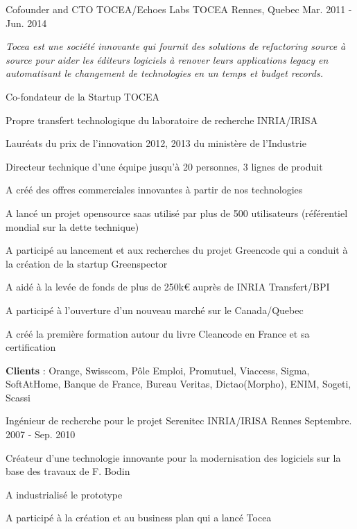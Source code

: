 \begin{cventries}
  \cventry
    {Cofounder and CTO TOCEA/Echoes Labs} %
    {TOCEA} %
    {Rennes, Quebec} %
    {Mar. 2011 - Jun. 2014} %
    {
      \begin{cvitems} %
      	 \item {\textit{Tocea est une société innovante qui fournit des solutions de refactoring source à source pour aider les éditeurs logiciels à renover leurs applications legacy en automatisant le changement de technologies en un temps et budget records.}}
        \item {Co-fondateur de la Startup TOCEA}        
        \item {Propre transfert technologique du laboratoire de recherche INRIA/IRISA}
        \item {Lauréats du prix de l'innovation 2012, 2013 du ministère de l'Industrie}                
        \item {Directeur technique d'une équipe jusqu'à 20 personnes, 3 lignes de produit}        
        \item {A créé des offres commerciales innovantes à partir de nos technologies}
        \item {A lancé un projet opensource saas utilisé par plus de 500 utilisateurs (référentiel mondial sur la dette technique)}
        \item {A participé au lancement et aux recherches du projet Greencode qui a conduit à la création de la startup Greenspector}
        \item {A aidé à la levée de fonds de plus de 250k€ auprès de INRIA Transfert/BPI }                
        \item {A participé à l'ouverture d'un nouveau marché sur le Canada/Quebec}
		\item {A créé la première formation autour du livre Cleancode en France et sa certification}
        \item {\textbf{Clients} : Orange, Swisscom, Pôle Emploi, Promutuel, Viaccess, Sigma, SoftAtHome, Banque de France, Bureau Veritas, Dictao(Morpho), ENIM, Sogeti, Scassi}
      \end{cvitems}
    }

  \cventry
    {Ingénieur de recherche pour le projet Serenitec} %
    {INRIA/IRISA} %
    {Rennes} %
    {Septembre. 2007 - Sep. 2010} %
    {
      \begin{cvitems} %
        \item {Créateur d'une technologie innovante pour la modernisation des logiciels sur la base des travaux de F. Bodin}
        \item {A industrialisé le prototype }
        \item {A participé à la création et au business plan qui a lancé Tocea}        
      \end{cvitems} 
    }


\end{cventries}
